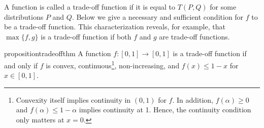 A function is called a trade-off function if it is equal to $T(P, Q)$ for some distributions $P$ and $Q$. Below we give a necessary and sufficient condition for $f$ to be a trade-off function. This characterization reveals, for example, that $\max\{f, g\}$ is a trade-off function if both $f$ and $g$ are trade-off functions.
\begin{restatable}{proposition}{tradeoffthm}\label{prop:trade-off}
A function $f: [0, 1] \rightarrow [0, 1]$ is a trade-off function if and only if $f$ is convex, continuous\footnote{Convexity itself implies continuity in $(0,1)$ for $f$. In addition, $f(\alpha) \ge 0$ and $f(\alpha) \le 1-\alpha$ implies continuity at 1. Hence, the continuity condition only matters at $x = 0$.}, non-increasing, and $f(x) \leqslant 1-x$ for $x \in [0,1]$.
\end{restatable}




